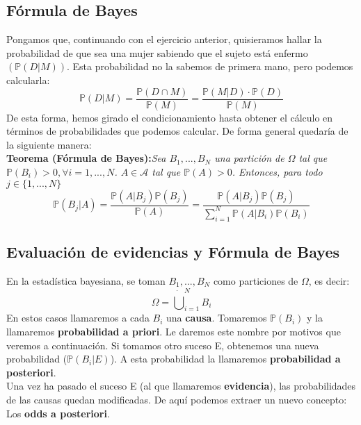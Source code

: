 \documentclass[11pt]{article}
\newcommand{\prob}{\mathbb{P}}
\newcommand{\OMG}{\varOmega}
\theoremstyle{plain}
\begin{document}
        \subsection{Fórmula de Bayes} %
        \label{sub:fórmula_de_bayes}
            Pongamos que, continuando con el ejercicio anterior, quisieramos hallar la probabilidad de que sea una mujer sabiendo que el sujeto está enfermo $(\prob(D|M))$. Esta probabilidad no la sabemos de primera mano, pero podemos calcularla:
            \[\prob (D|M) = \frac{\prob(D \cap M)}{\prob (M)} = \frac{\prob(M|D) \cdot \prob(D)}{\prob(M)}\]
            De esta forma, hemos girado el condicionamiento hasta obtener el cálculo en términos de probabilidades que podemos calcular. De forma general quedaría de la siguiente manera:\\

            \textbf{Teorema (Fórmula de Bayes):}\textit{Sea $B_1,...,B_N$ una partición de $\OMG$ tal que $\prob(B_i)>0, \forall i = 1,...,N$. $A \in \mathcal{A}$ tal que $\prob(A) >0$. Entonces, para todo $j \in \{1,...,N\}$}
            \begin{equation}
                \prob (B_j|A) = \frac{\prob(A|B_j)\prob(B_j)}{\prob(A)} = \frac{\prob(A|B_j)\prob(B_j)}{\sum_{i=1}^{N} \prob(A|B_i)\prob(B_i)}
            \end{equation}
        \subsection{Evaluación de evidencias y Fórmula de Bayes} %
        \label{sub:evaluación_de_evidencias_y_fórmula_de_bayes}
            En la estadística bayesiana, se toman $B_1,...,B_N$ como particiones de $\OMG$, es decir: \[\OMG = \dot{\bigcup}_{i=1}^{N} B_i\]
            En estos casos llamaremos a cada $B_i$ una \textbf{causa}. Tomaremos $\prob(B_i)$ y la llamaremos \textbf{probabilidad a priori}. Le daremos este nombre por motivos que veremos a continuación. Si tomamos otro suceso E, obtenemos una nueva probabilidad ($\prob(B_i|E)$). A esta probabilidad la llamaremos \textbf{probabilidad a posteriori}.\\

            Una vez ha pasado el suceso E (al que llamaremos \textbf{evidencia}), las probabilidades de las causas quedan modificadas. De aquí podemos extraer un nuevo concepto: Los \textbf{odds a posteriori}.\\
\end{document}
